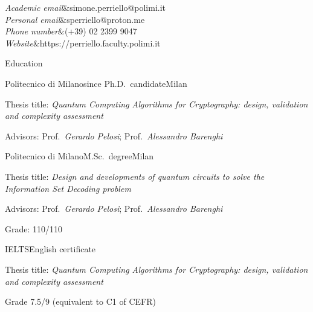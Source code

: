 \documentclass[
	a4paper, %
	11pt, %
]{resume} %
\newenvironment{mytabular}
  {\trivlist\item
    \tabular{ll}}
  {\endtabular\endtrivlist}
\newcommand{\row}[2]{\textit{#1}&#2\\}
\newif\ifpublic{}
\begin{document}
\ifpublic{%
    \begin{mytabular}
      \row{Academic email}{simone.perriello@polimi.it}
    \end{mytabular}%
  }
\else{%
    \begin{mytabular}
      \row{Academic email}{simone.perriello@polimi.it}
      \row{Personal email}{sperriello@proton.me}
      \row{Phone number}{(+39) 02 2399 9047}
      \row{Website}{https://perriello.faculty.polimi.it}
    \end{mytabular}%
  }
\fi

\begin{rSection}{Education}
  \begin{rSubsection}{Politecnico di Milano}{since }{Ph.D.\ candidate}{Milan}
  \item Thesis title: \emph{Quantum Computing Algorithms for Cryptography: design, validation and complexity assessment}
  \item Advisors: Prof.\ \emph{Gerardo Pelosi}; Prof.\ \emph{Alessandro Barenghi}
  \end{rSubsection}
  \begin{rSubsection}{Politecnico di Milano}{}{M.Sc.\ degree}{Milan}
  \item Thesis title: \emph{Design and developments of quantum circuits to solve the Information Set Decoding problem}
  \item Advisors: Prof.\ \emph{Gerardo Pelosi}; Prof.\ \emph{Alessandro
      Barenghi}
  \item Grade: 110/110
  \end{rSubsection}
  \begin{rSubsection}{IELTS}{}{English certificate}{}
  \item Thesis title: \textit{Quantum Computing Algorithms for Cryptography: design, validation and complexity assessment}
  \item Grade 7.5/9 (equivalent to C1 of CEFR)
  \end{rSubsection}
\end{rSection}
\end{document}
